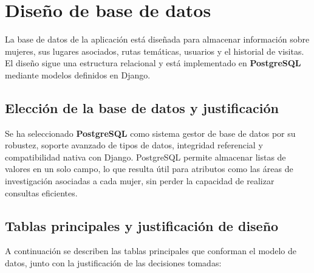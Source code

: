 




\section{Diseño de base de datos}

La base de datos de la aplicación está diseñada para almacenar información sobre mujeres, sus lugares asociados, rutas temáticas, usuarios y el historial de visitas. El diseño sigue una estructura relacional y está implementado en \textbf{PostgreSQL} mediante modelos definidos en Django.

\subsection{Elección de la base de datos y justificación}

Se ha seleccionado \textbf{PostgreSQL} como sistema gestor de base de datos por su robustez, soporte avanzado de tipos de datos, integridad referencial y compatibilidad nativa con Django. PostgreSQL permite almacenar listas de valores en un solo campo, lo que resulta útil para atributos como las áreas de investigación asociadas a cada mujer, sin perder la capacidad de realizar consultas eficientes.

\subsection{Tablas principales y justificación de diseño}

A continuación se describen las tablas principales que conforman el modelo de datos, junto con la justificación de las decisiones tomadas:

